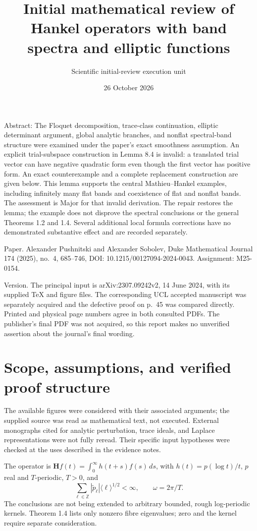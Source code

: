 \documentclass[10pt]{article}
\title{Initial mathematical review of
Hankel operators with band spectra and elliptic functions}
\author{Scientific initial-review execution unit}
\date{26 October 2026}
\begin{document}
\maketitle
Abstract: The Floquet decomposition, trace-class continuation, elliptic determinant argument, global analytic branches, and nonflat spectral-band structure were examined under the paper’s exact smoothness assumption. An explicit trial-subspace construction in Lemma 8.4 is invalid: a translated trial vector can have negative quadratic form even though the first vector has positive form. An exact counterexample and a complete replacement construction are given below. This lemma supports the central Mathieu–Hankel examples, including infinitely many flat bands and coexistence of flat and nonflat bands. The assessment is Major for that invalid derivation. The repair restores the lemma; the example does not disprove the spectral conclusions or the general Theorems 1.2 and 1.4. Several additional local formula corrections have no demonstrated substantive effect and are recorded separately.\par
Paper. Alexander Pushnitski and Alexander Sobolev, Duke Mathematical Journal 174 (2025), no. 4, 685–746, DOI: 10.1215/00127094-2024-0043. Assignment: M25-0154.\par
Version. The principal input is arXiv:2307.09242v2, 14 June 2024, with its supplied TeX and figure files. The corresponding UCL accepted manuscript was separately acquired and the defective proof on p. 45 was compared directly. Printed and physical page numbers agree in both consulted PDFs. The publisher’s final PDF was not acquired, so this report makes no unverified assertion about the journal’s final wording.\par
\section*{Scope, assumptions, and verified proof structure}
The available figures were considered with their associated arguments; the supplied source was read as mathematical text, not executed. External monographs cited for analytic perturbation, trace ideals, and Laplace representations were not fully reread. Their specific input hypotheses were checked at the uses described in the evidence notes.\par
The operator is \(\mathbf Hf(t)=\int_0^\infty h(t+s)f(s)\,ds\), with \(h(t)=p(\log t)/t\), \(p\) real and \(T\)-periodic, \(T>0\), and \[\sum_{\ell\in\mathbb Z}|\widetilde p_\ell|
       \langle\ell\rangle^{1/2}<\infty,\qquad \omega=2\pi/T.\] The conclusions are not being extended to arbitrary bounded, rough log-periodic kernels. Theorem 1.4 lists only nonzero fibre eigenvalues; zero and the kernel require separate consideration.\par
\end{document}
